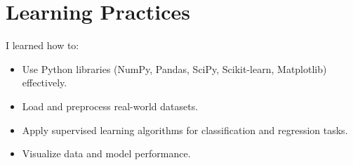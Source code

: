 \documentclass[11pt]{article}
\begin{document}
\section*{Learning Practices}
I learned how to:
\begin{itemize}
    \item Use Python libraries (NumPy, Pandas, SciPy, Scikit-learn, Matplotlib) effectively.
    \item Load and preprocess real-world datasets.
    \item Apply supervised learning algorithms for classification and regression tasks.
    \item Visualize data and model performance.
\end{itemize}
\end{document}
